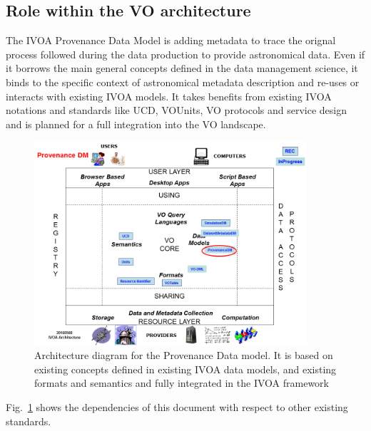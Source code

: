 \subsection{Role within the VO architecture}
 The IVOA Provenance Data Model is adding metadata to trace the orignal process followed during the data production to provide astronomical data. Even if it borrows the main general concepts defined in the data management science, it binds to the specific context of astronomical metadata description and re-uses or interacts with existing IVOA models.
It takes benefits from existing IVOA notations and standards like UCD, VOUnits, VO protocols and service design and is planned for a full integration into the VO landscape.

\begin{figure}
\centering
\includegraphics[width=0.9\textwidth]{VOArchitecture-Prov2016.png}
\caption{Architecture diagram for the Provenance Data model. It is based on existing concepts defined in existing IVOA data models, and existing formats and semantics and fully integrated in the IVOA framework}
\label{fig:archdiag}
\end{figure}

Fig.~\ref{fig:archdiag} shows the dependencies of this document with respect to other existing standards.
